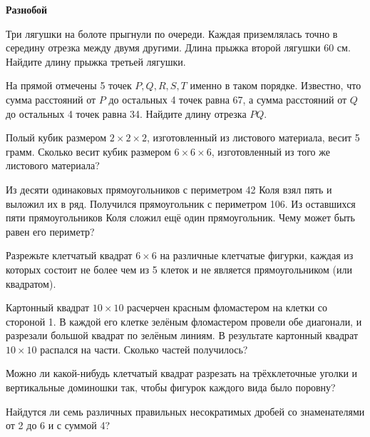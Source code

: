 \documentclass{article}
\begin{document}
    \large

    \begin{center}
        \textbf{Разнобой}
    \end{center}


    \begin{enumerate_boxed}
        \item Три лягушки на болоте прыгнули по очереди.
        Каждая приземлялась точно в середину отрезка между двумя другими.
        Длина прыжка второй лягушки 60 см.
        Найдите длину прыжка третьей лягушки.

        \item На прямой отмечены 5 точек $P, Q, R, S, T$ именно в таком порядке.
        Известно, что сумма расстояний от $P$ до остальных 4 точек равна 67, а сумма расстояний
        от $Q$ до остальных 4 точек равна 34.
        Найдите длину отрезка $P Q$.

        \item Полый кубик размером $2 \times 2 \times 2$, изготовленный из листового материала, весит 5 грамм.
        Сколько весит кубик размером $6 \times 6 \times 6$, изготовленный из того же листового материала?

        \item Из десяти одинаковых прямоугольников с периметром 42 Коля взял пять и выложил их в ряд.
        Получился прямоугольник с периметром 106.
        Из оставшихся пяти прямоугольников Коля сложил ещё один прямоугольник.
        Чему может быть равен его периметр?

        \item Разрежьте клетчатый квадрат $6 \times 6$ на различные клетчатые фигурки, каждая из которых состоит не более чем из 5 клеток и не является прямоугольником (или квадратом).

        \item Картонный квадрат $10 \times 10$ расчерчен красным фломастером на клетки со стороной 1.
        В каждой его клетке зелёным фломастером провели обе диагонали, и разрезали большой квадрат по зелёным линиям.
        В результате картонный квадрат $10 \times 10$ распался на части.
        Сколько частей получилось?

        \item Можно ли какой-нибудь клетчатый квадрат разрезать на трёхклеточные уголки и вертикальные доминошки так, чтобы фигурок каждого вида было поровну?

        \item Найдутся ли семь различных правильных несократимых дробей со знаменателями от 2 до 6 и с суммой 4?


\end{enumerate_boxed}
\end{document}
